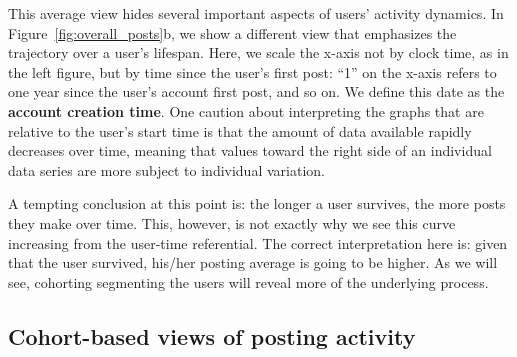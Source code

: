 This average view hides several important aspects of users' activity dynamics.  In Figure~\ref{fig:overall_posts}b, we show a different view that emphasizes the trajectory over a user's lifespan.  Here, we scale the x-axis not by clock time, as in the left figure, but by time since the user's first post: ``1'' on the x-axis refers to one year since the user's account first post, and so on. We define this date as the \textbf{account creation time}.
One caution about interpreting the graphs that are relative to the user's start time is that the amount of data available rapidly decreases over time, meaning that values toward the right side of an individual data series are more subject to individual variation.  



A tempting conclusion at this point is: the longer a user survives, the more posts they make over time. This, however, is not exactly why we see this curve increasing from the user-time referential. The correct interpretation here is: given that the user survived, his/her posting average is going to be higher. As we will see, cohorting segmenting the users will reveal more of the underlying process. 


\subsection{Cohort-based views of posting activity}

